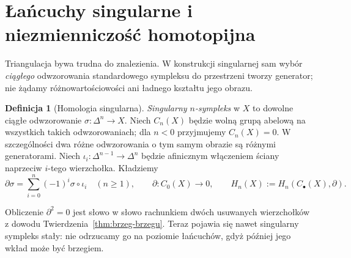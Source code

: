 \documentclass[11pt,a4paper,oneside]{report}
\theoremstyle{plain}
\theoremstyle{definition}
\newtheorem{definicja}[twierdzenie]{Definicja}
\theoremstyle{remark}
\begin{document}
\section{Łańcuchy singularne i niezmienniczość homotopijna}
\label{sec:homologia-singularna}

Triangulacja bywa trudna do znalezienia. W konstrukcji
singularnej sam wybór \emph{ciągłego} odwzorowania
standardowego sympleksu do przestrzeni tworzy
generator; nie żądamy różnowartościowości ani
ładnego kształtu jego obrazu.

\begin{definicja}[Homologia singularna]
\label{def:homologia-singularna}
\emph{Singularny $n$-sympleks} w $X$ to dowolne
ciągłe odwzorowanie $\sigma:\Delta^n\to X$.
Niech $C_n(X)$ będzie wolną grupą abelową
na wszystkich takich odwzorowaniach; dla $n<0$ przyjmujemy $C_n(X)=0$.
W szczególności
dwa różne odwzorowania o tym samym obrazie są
różnymi generatorami. Niech
$\iota_i:\Delta^{n-1}\to\Delta^n$
będzie afinicznym włączeniem ściany
naprzeciw $i$-tego wierzchołka. Kładziemy
\begin{equation}\label{eq:singular-boundary}
 \partial\sigma=\sum_{i=0}^n(-1)^i
 \sigma\circ\iota_i\quad(n\geq1),
 \qquad \partial:C_0(X)\to0,
 \qquad H_n(X):=H_n(C_\bullet(X),\partial).
\end{equation}
\end{definicja}

Obliczenie $\partial^2=0$ jest słowo w słowo
rachunkiem dwóch usuwanych wierzchołków
z dowodu Twierdzenia~\ref{thm:brzeg-brzegu}.
Teraz pojawia się nawet singularny sympleks
stały: nie odrzucamy go na poziomie
łańcuchów, gdyż później jego wkład może
być brzegiem.
\end{document}
